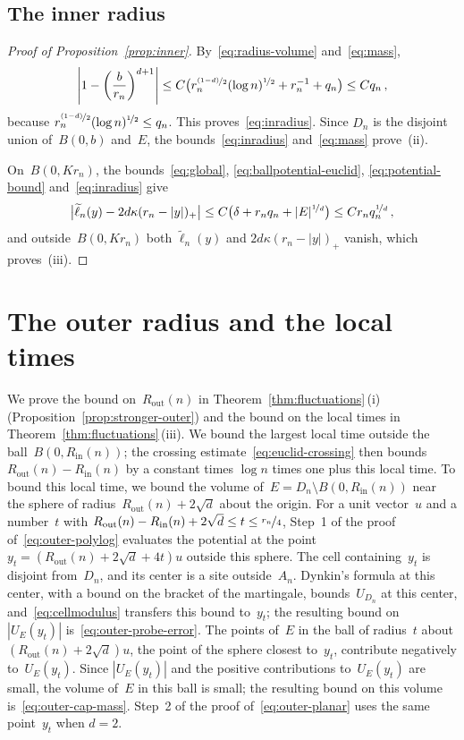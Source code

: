 \documentclass[11pt]{amsart}
\theoremstyle{plain}
\theoremstyle{definition}
\newcommand{\drift}{\kappa}
\newcommand{\nf}{\nicefrac}
\newcommand{\Rin}{R_{\mathrm{in}}}
\newcommand{\Rout}{R_{\mathrm{out}}}
\numberwithin{equation}{section}
\begin{document}
\subsection{The inner radius}

\begin{proof}[Proof of Proposition~\ref{prop:inner}]
By~\eqref{eq:radius-volume} and~\eqref{eq:mass},
\begin{equation*}
\left|1-\left(\frac b{r_n}\right)^{d+1}\right|
\leq C\bigl(r_n^{\nf{(1-d)}{2}}(\log n)^{\nf12}+r_n^{-1}+q_n\bigr)
\leq Cq_n\, ,
\end{equation*}
because $r_n^{\nf{(1-d)}{2}}(\log n)^{\nf12}\leq q_n$. This proves~\eqref{eq:inradius}. Since $D_n$ is the disjoint union of~$B(0,b)$ and~$E$, the bounds~\eqref{eq:inradius} and~\eqref{eq:mass} prove~(ii).

On~$B(0,Kr_n)$, the bounds~\eqref{eq:global}, \eqref{eq:ballpotential-euclid}, \eqref{eq:potential-bound} and~\eqref{eq:inradius} give
\begin{equation*}
\bigl|\widetilde\ell_n(y)-2d\drift(r_n-|y|)_+\bigr|
\leq C\bigl(\delta+r_nq_n+|E|^{\nf1d}\bigr)\leq Cr_nq_n^{\nf1d}\, ,
\end{equation*}
and outside~$B(0,Kr_n)$ both $\widetilde\ell_n(y)$ and $2d\drift(r_n-|y|)_+$ vanish, which proves~(iii).
\end{proof}

\section{The outer radius and the local times}\label{sec:outer}

We prove the bound on~$\Rout(n)$ in Theorem~\ref{thm:fluctuations}\,(i) (Proposition~\ref{prop:stronger-outer}) and the bound on the local times in Theorem~\ref{thm:fluctuations}\,(iii). We bound the largest local time outside the ball~$B(0,\Rin(n))$; the crossing estimate~\eqref{eq:euclid-crossing} then bounds $\Rout(n)-\Rin(n)$ by a constant times $\log n$ times one plus this local time. To bound this local time, we bound the volume of~$E=D_n\setminus B(0,\Rin(n))$ near the sphere of radius~$\Rout(n)+2\sqrt d$ about the origin. For a unit vector~$u$ and a number~$t$ with $\Rout(n)-\Rin(n)+2\sqrt d\leq t\leq\nf{r_n}{4}$, Step~1 of the proof of~\eqref{eq:outer-polylog} evaluates the potential at the point $y_t=(\Rout(n)+2\sqrt d+4t)u$ outside this sphere. The cell containing~$y_t$ is disjoint from~$D_n$, and its center is a site outside~$A_n$. Dynkin's formula at this center, with a bound on the bracket of the martingale, bounds~$U_{D_n}$ at this center, and~\eqref{eq:cellmodulus} transfers this bound to~$y_t$; the resulting bound on~$|U_E(y_t)|$ is~\eqref{eq:outer-probe-error}. The points of~$E$ in the ball of radius~$t$ about $(\Rout(n)+2\sqrt d)u$, the point of the sphere closest to~$y_t$, contribute negatively to~$U_E(y_t)$. Since $|U_E(y_t)|$ and the positive contributions to~$U_E(y_t)$ are small, the volume of~$E$ in this ball is small; the resulting bound on this volume is~\eqref{eq:outer-cap-mass}. Step~2 of the proof of~\eqref{eq:outer-planar} uses the same point~$y_t$ when $d=2$.
\end{document}
